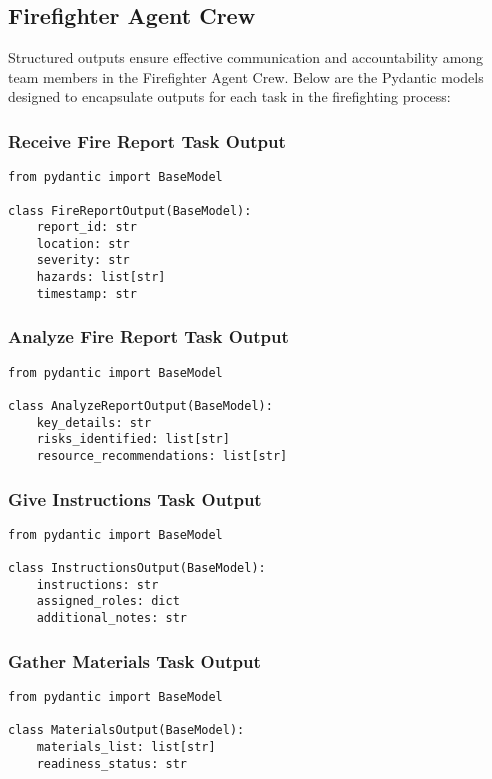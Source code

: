 \subsection{Firefighter Agent Crew}

Structured outputs ensure effective communication and accountability among team members in the Firefighter Agent Crew. Below are the Pydantic models designed to encapsulate outputs for each task in the firefighting process:

\subsubsection{Receive Fire Report Task Output}
\begin{lstlisting}[caption={Pydantic model for Receive Fire Report Task Output}]
from pydantic import BaseModel

class FireReportOutput(BaseModel):
    report_id: str
    location: str
    severity: str
    hazards: list[str]
    timestamp: str
\end{lstlisting}

\subsubsection{Analyze Fire Report Task Output}
\begin{lstlisting}[caption={Pydantic model for Analyze Fire Report Task Output}]
from pydantic import BaseModel

class AnalyzeReportOutput(BaseModel):
    key_details: str
    risks_identified: list[str]
    resource_recommendations: list[str]
\end{lstlisting}

\subsubsection{Give Instructions Task Output}
\begin{lstlisting}[caption={Pydantic model for Give Instructions Task Output}]
from pydantic import BaseModel

class InstructionsOutput(BaseModel):
    instructions: str
    assigned_roles: dict
    additional_notes: str
\end{lstlisting}

\subsubsection{Gather Materials Task Output}
\begin{lstlisting}[caption={Pydantic model for Gather Materials Task Output}]
from pydantic import BaseModel

class MaterialsOutput(BaseModel):
    materials_list: list[str]
    readiness_status: str
\end{lstlisting}

